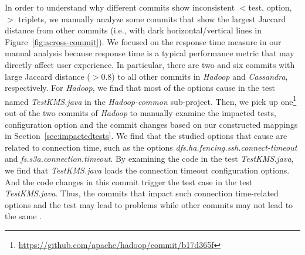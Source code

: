 In order to understand why different commits show inconsistent $<$test, option, \inconsistent$>$ triplets, 
we manually analyze some commits that show the largest Jaccard distance from other commits (i.e., with dark horizontal/vertical lines in Figure~\ref{fig:across-commit}). We focused on the response time measure in our manual analysis because response time is a typical performance metric that may directly affect user experience. %
In particular, there are two and six commits with large Jaccard distance ($>0.8$) to all other commits in \emph{Hadoop} and \emph{Cassandra}, respectively. 
For \emph{Hadoop}, we find that most of the options cause \inconsistent in the test named \emph{TestKMS.java} in the \emph{Hadoop-common} sub-project. 
Then, we pick up one\footnote{\url{https://github.com/apache/hadoop/commit/b17d365f}} out of the two commits of \emph{Hadoop} to manually examine the impacted tests, configuration option and the commit changes based on our constructed mappings in Section~\ref{sec:impactedtests}. %
We find that the studied options that cause \inconsistent are related to connection time, such as the options \emph{dfs.ha.fencing.ssh.connect-timeout} and \emph{fs.s3a.connection.timeout}. By examining the code in the test \emph{TestKMS.java}, we find that \emph{TestKMS.java} loads the connection timeout configuration options. And the code changes in this commit trigger the test case in the test \emph{TestKMS.java}. 
Thus, the commits that impact such connection time-related options and the test may lead to \inconsistent problems while other commits may not lead to the same \inconsistent. %

